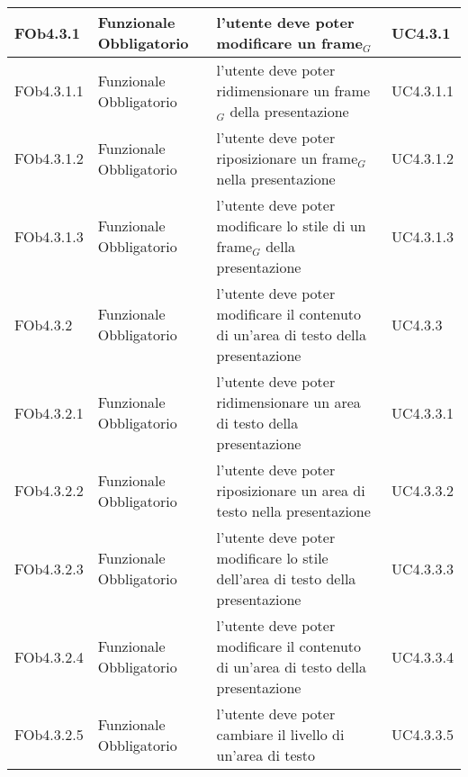 \begin{longtable}{|l|p{2.5cm}|p{5cm}|p{3.5cm}|}
FOb4.3.1 & Funzionale \linebreak Obbligatorio & l'utente deve poter modificare un frame$_G$ & UC4.3.1 \linebreak  \\
\hline
FOb4.3.1.1 & Funzionale \linebreak Obbligatorio & l'utente deve poter ridimensionare un frame$_G$ della presentazione & UC4.3.1.1 \linebreak  \\
\hline
FOb4.3.1.2 & Funzionale \linebreak Obbligatorio & l'utente deve poter riposizionare un frame$_G$ nella presentazione & UC4.3.1.2 \linebreak  \\
\hline
FOb4.3.1.3 & Funzionale \linebreak Obbligatorio & l'utente deve poter modificare lo stile di un frame$_G$ della presentazione & UC4.3.1.3 \linebreak  \\
\hline
FOb4.3.2 & Funzionale \linebreak Obbligatorio & l'utente deve poter modificare il contenuto di un'area di testo della presentazione & UC4.3.3 \linebreak  \\
\hline
FOb4.3.2.1 & Funzionale \linebreak Obbligatorio & l'utente deve poter ridimensionare un area di testo della presentazione & UC4.3.3.1 \linebreak  \\
\hline
FOb4.3.2.2 & Funzionale \linebreak Obbligatorio & l'utente deve poter riposizionare un area di testo nella presentazione & UC4.3.3.2 \linebreak  \\
\hline
FOb4.3.2.3 & Funzionale \linebreak Obbligatorio & l'utente deve poter modificare lo stile dell'area di testo della presentazione & UC4.3.3.3 \linebreak  \\
\hline
FOb4.3.2.4 & Funzionale \linebreak Obbligatorio & l'utente deve poter modificare il contenuto di un'area di testo della presentazione & UC4.3.3.4 \linebreak  \\
\hline
FOb4.3.2.5 & Funzionale \linebreak Obbligatorio & l'utente deve poter cambiare il livello di un'area di testo & UC4.3.3.5 \linebreak  \\

\end{longtable}
